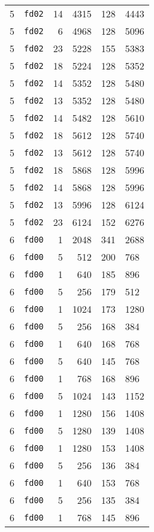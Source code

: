 \documentclass{article}
\begin{document}
\begin{table}[h!]
\begin{tabular}{llrrrl}
    5 & \texttt{fd02} & 14 & 4315 & 128 & 4443 \\
    5 & \texttt{fd02} & 6 & 4968 & 128 & 5096 \\
    5 & \texttt{fd02} & 23 & 5228 & 155 & 5383 \\
    5 & \texttt{fd02} & 18 & 5224 & 128 & 5352 \\
    5 & \texttt{fd02} & 14 & 5352 & 128 & 5480 \\
    5 & \texttt{fd02} & 13 & 5352 & 128 & 5480 \\
    5 & \texttt{fd02} & 14 & 5482 & 128 & 5610 \\
    5 & \texttt{fd02} & 18 & 5612 & 128 & 5740 \\
    5 & \texttt{fd02} & 13 & 5612 & 128 & 5740 \\
    5 & \texttt{fd02} & 18 & 5868 & 128 & 5996 \\
    5 & \texttt{fd02} & 14 & 5868 & 128 & 5996 \\
    5 & \texttt{fd02} & 13 & 5996 & 128 & 6124 \\
    5 & \texttt{fd02} & 23 & 6124 & 152 & 6276 \\
    6 & \texttt{fd00} & 1 & 2048 & 341 & 2688 \\
    6 & \texttt{fd00} & 5 & 512 & 200 & 768 \\
    6 & \texttt{fd00} & 1 & 640 & 185 & 896 \\
    6 & \texttt{fd00} & 5 & 256 & 179 & 512 \\
    6 & \texttt{fd00} & 1 & 1024 & 173 & 1280 \\
    6 & \texttt{fd00} & 5 & 256 & 168 & 384 \\
    6 & \texttt{fd00} & 1 & 640 & 168 & 768 \\
    6 & \texttt{fd00} & 5 & 640 & 145 & 768 \\
    6 & \texttt{fd00} & 1 & 768 & 168 & 896 \\
    6 & \texttt{fd00} & 5 & 1024 & 143 & 1152 \\
    6 & \texttt{fd00} & 1 & 1280 & 156 & 1408 \\
    6 & \texttt{fd00} & 5 & 1280 & 139 & 1408 \\
    6 & \texttt{fd00} & 1 & 1280 & 153 & 1408 \\
    6 & \texttt{fd00} & 5 & 256 & 136 & 384 \\
    6 & \texttt{fd00} & 1 & 640 & 153 & 768 \\
    6 & \texttt{fd00} & 5 & 256 & 135 & 384 \\
    6 & \texttt{fd00} & 1 & 768 & 145 & 896 \\

\end{tabular}
\end{table}
\end{document}

